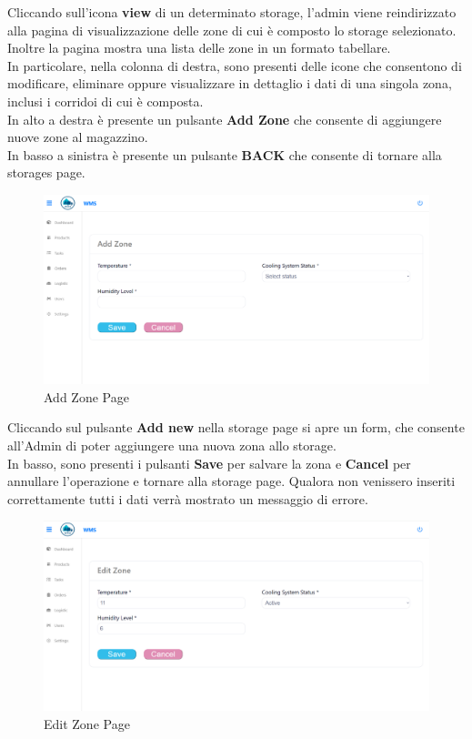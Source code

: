 Cliccando sull'icona \textbf{view} di un determinato storage, l’admin viene
reindirizzato alla pagina di visualizzazione delle zone di cui è composto lo storage selezionato.\\
Inoltre la pagina mostra una lista delle zone in un formato tabellare. \\
In particolare, nella colonna di destra, sono presenti delle icone che consentono di modificare, eliminare oppure
visualizzare in dettaglio i dati di una singola zona, inclusi i corridoi di cui è composta.\\
In alto a destra è presente un pulsante \textbf{Add Zone} che consente di aggiungere nuove zone al magazzino.\\
In basso a sinistra è presente un pulsante \textbf{BACK} che consente di tornare alla storages page.

\begin{figure}[H]
    \centering
    \includegraphics[width=\textwidth]{document/sections/img/Storyboard/addZone.png}
    \caption{Add Zone Page}
    \label{fig:addZonePages}
\end{figure}

Cliccando sul pulsante \textbf{Add new} nella storage page si apre un form, che consente
all'Admin di poter aggiungere una nuova zona allo storage.\\
In basso, sono presenti i pulsanti \textbf{Save} per salvare la zona e \textbf{Cancel} per annullare l'operazione
e tornare alla storage page.
Qualora non venissero inseriti correttamente tutti i dati verrà mostrato un messaggio di errore.

\begin{figure}[H]
    \centering
    \includegraphics[width=\textwidth]{document/sections/img/Storyboard/editZonePage.png}
    \caption{Edit Zone Page}
    \label{fig:editZonePage}
\end{figure}

